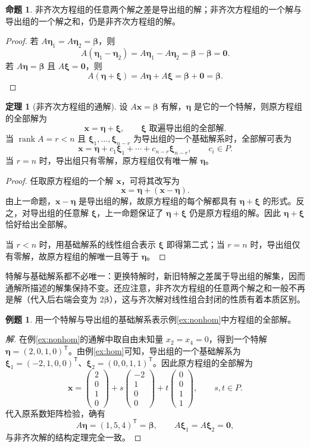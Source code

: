 \documentclass[UTF8, fontset=fandol, a4paper, 12pt]{ctexart}
\newcommand{\rank}{\operatorname{rank}}
\newcommand{\vx}{\boldsymbol{x}}
\newcommand{\vb}{\boldsymbol{\beta}}
\newcommand{\vo}{\boldsymbol{0}}
\newcommand{\vxi}{\boldsymbol{\xi}}
\newcommand{\veta}{\boldsymbol{\eta}}
\theoremstyle{definition}
\newtheorem{proposition}[definition]{命题}
\newtheorem{theorem}[definition]{定理}
\newtheorem{example}[definition]{例题}
\begin{document}
\begin{proposition}
非齐次方程组的任意两个解之差是导出组的解；非齐次方程组的一个解与导出组的一个解之和，仍是非齐次方程组的解。
\end{proposition}
\begin{proof}
若 $A\veta_1=A\veta_2=\vb$，则
\[
 A(\veta_1-\veta_2)=A\veta_1-A\veta_2=\vb-\vb=\vo.
\]
若 $A\veta=\vb$ 且 $A\vxi=\vo$，则
\[
 A(\veta+\vxi)=A\veta+A\vxi=\vb+\vo=\vb.
\]
\end{proof}

\begin{theorem}[非齐次方程组的通解]
设 $A\vx=\vb$ 有解，$\veta$ 是它的一个特解，则原方程组的全部解为
\[
 \boxed{\vx=\veta+\vxi,\qquad \vxi\text{ 取遍导出组的全部解}.}
\]
当 $\rank A=r<n$ 且 $\vxi_1,\ldots,\vxi_{n-r}$ 为导出组的一个基础解系时，全部解可表为
\[
 \boxed{\vx=\veta+c_1\vxi_1+\cdots+c_{n-r}\vxi_{n-r},\qquad c_i\in P.}
\]
当 $r=n$ 时，导出组只有零解，原方程组仅有唯一解 $\veta$。
\end{theorem}
\begin{proof}
任取原方程组的一个解 $\vx$，可将其改写为
\[
 \vx=\veta+(\vx-\veta).
\]
由上一命题，$\vx-\veta$ 是导出组的解，故原方程组的每个解都具有 $\veta+\vxi$ 的形式。反之，对导出组的任意解 $\vxi$，上一命题保证了 $\veta+\vxi$ 仍是原方程组的解。因此 $\veta+\vxi$ 恰好给出全部解。

当 $r<n$ 时，用基础解系的线性组合表示 $\vxi$ 即得第二式；当 $r=n$ 时，导出组仅有零解，故原方程组的解唯一且等于 $\veta$。
\end{proof}

特解与基础解系都不必唯一：更换特解时，新旧特解之差属于导出组的解集，因而通解所描述的解集保持不变。还应注意，非齐次方程组的任意两个解之和一般不再是解（代入后右端会变为 $2\vb$），这与齐次解对线性组合封闭的性质有着本质区别。

\begin{example}
用一个特解与导出组的基础解系表示例\ref{ex:nonhom}中方程组的全部解。
\end{example}
\begin{proof}[解]
在例\ref{ex:nonhom}的通解中取自由未知量 $x_2=x_4=0$，得到一个特解 $\veta=(2,0,1,0)^{\mathsf T}$。由例\ref{ex:hom}可知，导出组的一个基础解系为 $\vxi_1=(-2,1,0,0)^{\mathsf T}$、$\vxi_2=(0,0,1,1)^{\mathsf T}$。因此原方程组的全部解为
\[
 \boxed{\vx=
 \begin{pmatrix}2\\0\\1\\0\end{pmatrix}
 +s\begin{pmatrix}-2\\1\\0\\0\end{pmatrix}
 +t\begin{pmatrix}0\\0\\1\\1\end{pmatrix},\qquad s,t\in P.}
\]
代入原系数矩阵检验，确有
\[
 A\veta=(1,5,4)^{\mathsf T}=\vb,\qquad A\vxi_1=A\vxi_2=\vo,
\]
与非齐次解的结构定理完全一致。
\end{proof}
\end{document}
